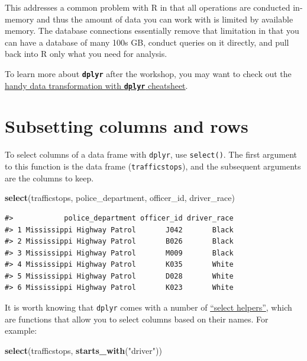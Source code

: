\documentclass[]{book}
\newenvironment{Shaded}{\begin{snugshade}}{\end{snugshade}}
\newcommand{\KeywordTok}[1]{\textcolor[rgb]{0.13,0.29,0.53}{\textbf{#1}}}
\newcommand{\StringTok}[1]{\textcolor[rgb]{0.31,0.60,0.02}{#1}}
\newcommand{\NormalTok}[1]{#1}
\theoremstyle{definition}
\theoremstyle{definition}
\theoremstyle{definition}
\theoremstyle{remark}
\begin{document}
This addresses a common problem with R in that all operations are
conducted in-memory and thus the amount of data you can work with is
limited by available memory. The database connections essentially remove
that limitation in that you can have a database of many 100s GB, conduct
queries on it directly, and pull back into R only what you need for
analysis.

To learn more about \textbf{\texttt{dplyr}} after the workshop, you may
want to check out the
\href{https://github.com/rstudio/cheatsheets/raw/master/data-transformation.pdf}{handy
data transformation with \textbf{\texttt{dplyr}} cheatsheet}.

\section{Subsetting columns and rows}\label{subsetting-columns-and-rows}

To select columns of a data frame with \texttt{dplyr}, use
\texttt{select()}. The first argument to this function is the data frame
(\texttt{trafficstops}), and the subsequent arguments are the columns to
keep.

\begin{Shaded}
\begin{Highlighting}[]
\KeywordTok{select}\NormalTok{(trafficstops, police_department, officer_id, driver_race)}
\end{Highlighting}
\end{Shaded}

\begin{verbatim}
#>            police_department officer_id driver_race
#> 1 Mississippi Highway Patrol       J042       Black
#> 2 Mississippi Highway Patrol       B026       Black
#> 3 Mississippi Highway Patrol       M009       Black
#> 4 Mississippi Highway Patrol       K035       White
#> 5 Mississippi Highway Patrol       D028       White
#> 6 Mississippi Highway Patrol       K023       White
\end{verbatim}

It is worth knowing that \texttt{dplyr} comes with a number of
\href{https://www.rdocumentation.org/packages/dplyr/versions/0.7.2/topics/select_helpers}{``select
helpers''}, which are functions that allow you to select columns based
on their names. For example:

\begin{Shaded}
\begin{Highlighting}[]
\KeywordTok{select}\NormalTok{(trafficstops, }\KeywordTok{starts_with}\NormalTok{(}\StringTok{"driver"}\NormalTok{))}
\end{Highlighting}
\end{Shaded}
\end{document}
